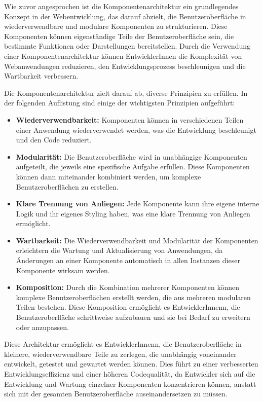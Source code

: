 Wie zuvor angesprochen ist die Komponentenarchitektur ein grundlegendes Konzept in der Webentwicklung, das darauf abzielt, die Benutzeroberfläche in wiederverwendbare und modulare Komponenten zu strukturieren. Diese Komponenten können eigenständige Teile der Benutzeroberfläche sein, die bestimmte Funktionen oder Darstellungen bereitstellen. Durch die Verwendung einer Komponentenarchitektur können EntwicklerInnen die Komplexität von Webanwendungen reduzieren, den Entwicklungsprozess beschleunigen und die Wartbarkeit verbessern.

Die Komponentenarchitektur zielt darauf ab, diverse Prinzipien zu erfüllen. In der folgenden Auflistung sind einige der wichtigsten Prinzipien aufgeführt:

\begin{itemize}
    \item \textbf{Wiederverwendbarkeit:} Komponenten können in verschiedenen Teilen einer Anwendung wiederverwendet werden, was die Entwicklung beschleunigt und den Code reduziert.
    \item \textbf{Modularität:} Die Benutzeroberfläche wird in unabhängige Komponenten aufgeteilt, die jeweils eine spezifische Aufgabe erfüllen. Diese Komponenten können dann miteinander kombiniert werden, um komplexe Benutzeroberflächen zu erstellen.
    \item \textbf{Klare Trennung von Anliegen:} Jede Komponente kann ihre eigene interne Logik und ihr eigenes Styling haben, was eine klare Trennung von Anliegen ermöglicht.
    \item \textbf{Wartbarkeit:} Die Wiederverwendbarkeit und Modularität der Komponenten erleichtern die Wartung und Aktualisierung von Anwendungen, da Änderungen an einer Komponente automatisch in allen Instanzen dieser Komponente wirksam werden.
    \item \textbf{Komposition:} Durch die Kombination mehrerer Komponenten können komplexe Benutzeroberflächen erstellt werden, die aus mehreren modularen Teilen bestehen. Diese Komposition ermöglicht es EntwicklerInnenn, die Benutzeroberfläche schrittweise aufzubauen und sie bei Bedarf zu erweitern oder anzupassen.
\end{itemize}

Diese Architektur ermöglicht es EntwicklerInnenn, die Benutzeroberfläche in kleinere, wiederverwendbare Teile zu zerlegen, die unabhängig voneinander entwickelt, getestet und gewartet werden können. Dies führt zu einer verbesserten Entwicklungseffizienz und einer höheren Codequalität, da Entwickler sich auf die Entwicklung und Wartung einzelner Komponenten konzentrieren können, anstatt sich mit der gesamten Benutzeroberfläche auseinandersetzen zu müssen.\cite{component-architecture:1, component-architecture:2}


